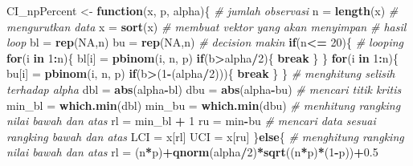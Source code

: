 \documentclass[]{book}
\newenvironment{Shaded}{\begin{snugshade}}{\end{snugshade}}
\newcommand{\KeywordTok}[1]{\textcolor[rgb]{0.13,0.29,0.53}{\textbf{#1}}}
\newcommand{\DecValTok}[1]{\textcolor[rgb]{0.00,0.00,0.81}{#1}}
\newcommand{\FloatTok}[1]{\textcolor[rgb]{0.00,0.00,0.81}{#1}}
\newcommand{\StringTok}[1]{\textcolor[rgb]{0.31,0.60,0.02}{#1}}
\newcommand{\CommentTok}[1]{\textcolor[rgb]{0.56,0.35,0.01}{\textit{#1}}}
\newcommand{\OtherTok}[1]{\textcolor[rgb]{0.56,0.35,0.01}{#1}}
\newcommand{\ControlFlowTok}[1]{\textcolor[rgb]{0.13,0.29,0.53}{\textbf{#1}}}
\newcommand{\OperatorTok}[1]{\textcolor[rgb]{0.81,0.36,0.00}{\textbf{#1}}}
\newcommand{\NormalTok}[1]{#1}
\begin{document}
\begin{Shaded}
\begin{Highlighting}[]
\NormalTok{CI_npPercent <-}\StringTok{ }\ControlFlowTok{function}\NormalTok{(x, p, alpha)\{}
  \CommentTok{# jumlah observasi}
\NormalTok{  n =}\StringTok{ }\KeywordTok{length}\NormalTok{(x)}
  \CommentTok{# mengurutkan data}
\NormalTok{  x =}\StringTok{ }\KeywordTok{sort}\NormalTok{(x)}
  \CommentTok{# membuat vektor yang akan menyimpan}
  \CommentTok{# hasil loop}
\NormalTok{  bl =}\StringTok{ }\KeywordTok{rep}\NormalTok{(}\OtherTok{NA}\NormalTok{,n)}
\NormalTok{  bu =}\StringTok{ }\KeywordTok{rep}\NormalTok{(}\OtherTok{NA}\NormalTok{,n)}
  \CommentTok{# decision makin}
  \ControlFlowTok{if}\NormalTok{(n}\OperatorTok{<=}\StringTok{ }\DecValTok{20}\NormalTok{)\{}
    \CommentTok{# looping}
    \ControlFlowTok{for}\NormalTok{(i }\ControlFlowTok{in} \DecValTok{1}\OperatorTok{:}\NormalTok{n)\{}
\NormalTok{      bl[i] =}\StringTok{ }\KeywordTok{pbinom}\NormalTok{(i, n, p)}
      \ControlFlowTok{if}\NormalTok{(b}\OperatorTok{>}\NormalTok{alpha}\OperatorTok{/}\DecValTok{2}\NormalTok{)\{}
        \ControlFlowTok{break}
\NormalTok{      \}}
\NormalTok{    \}}
    \ControlFlowTok{for}\NormalTok{(i }\ControlFlowTok{in} \DecValTok{1}\OperatorTok{:}\NormalTok{n)\{}
\NormalTok{      bu[i] =}\StringTok{ }\KeywordTok{pbinom}\NormalTok{(i, n, p)}
      \ControlFlowTok{if}\NormalTok{(b}\OperatorTok{>}\NormalTok{(}\DecValTok{1}\OperatorTok{-}\NormalTok{(alpha}\OperatorTok{/}\DecValTok{2}\NormalTok{)))\{}
        \ControlFlowTok{break}
\NormalTok{      \}}
\NormalTok{    \}}
   \CommentTok{# menghitung selisih terhadap alpha  }
\NormalTok{   dbl =}\StringTok{ }\KeywordTok{abs}\NormalTok{(alpha}\OperatorTok{-}\NormalTok{bl)}
\NormalTok{   dbu =}\StringTok{ }\KeywordTok{abs}\NormalTok{(alpha}\OperatorTok{-}\NormalTok{bu)}
   \CommentTok{# mencari titik kritis}
\NormalTok{   min_bl =}\StringTok{ }\KeywordTok{which.min}\NormalTok{(dbl)}
\NormalTok{   min_bu =}\StringTok{ }\KeywordTok{which.min}\NormalTok{(dbu)}
   \CommentTok{# menhitung rangking nilai bawah dan atas}
\NormalTok{   rl =}\StringTok{ }\NormalTok{min_bl }\OperatorTok{+}\StringTok{ }\DecValTok{1}
\NormalTok{   ru =}\StringTok{ }\NormalTok{min}\OperatorTok{-}\NormalTok{bu}
   \CommentTok{# mencari data sesuai rangking bawah dan atas}
\NormalTok{   LCI =}\StringTok{ }\NormalTok{x[rl]}
\NormalTok{   UCI =}\StringTok{ }\NormalTok{x[ru]}
\NormalTok{  \}}\ControlFlowTok{else}\NormalTok{\{}
    \CommentTok{# menghitung rangking nilai bawah dan atas}
\NormalTok{    rl =}\StringTok{ }\NormalTok{(n}\OperatorTok{*}\NormalTok{p)}\OperatorTok{+}\KeywordTok{qnorm}\NormalTok{(alpha}\OperatorTok{/}\DecValTok{2}\NormalTok{)}\OperatorTok{*}\KeywordTok{sqrt}\NormalTok{((n}\OperatorTok{*}\NormalTok{p)}\OperatorTok{*}\NormalTok{(}\DecValTok{1}\OperatorTok{-}\NormalTok{p))}\OperatorTok{+}\FloatTok{0.5}

\end{Highlighting}
\end{Shaded}
\end{document}
